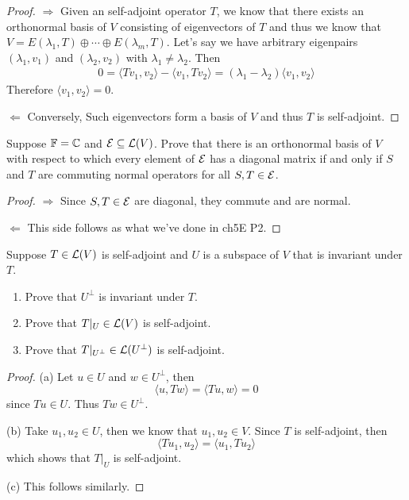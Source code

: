 \documentclass{extarticle}
\begin{document}
\begin{proof}
\(\Rightarrow\) Given an self-adjoint operator \(T\), we know that there exists an orthonormal basis 
of \(V\) consisting of eigenvectors of \(T\) and thus we know that \(V = E(\lambda_1, T) \oplus 
\cdots \oplus E(\lambda_m, T)\). Let's say we have arbitrary eigenpairs \((\lambda_1, v_1)\) and 
\((\lambda_2, v_2)\) with \(\lambda_1 \neq \lambda_2\). Then 
\begin{align*}
    0 = \langle Tv_1,v_2 \rangle - \langle v_1,Tv_2 \rangle 
    = (\lambda_1 - \lambda_2) \langle v_1,v_2 \rangle
\end{align*}
Therefore \(\langle v_1,v_2 \rangle = 0\). 

\(\Leftarrow\) Conversely, Such eigenvectors form a basis of \(V\) and thus \(T\) is self-adjoint. 
\end{proof}


\begin{problem}{16}
    Suppose \(\mathbb{F} = \mathbb{C}\) and \(\mathcal{E} \subseteq \mathcal{L}(V)\). Prove that there is an orthonormal basis of 
    \(V\) with respect to which every element of \(\mathcal{E}\) has a diagonal matrix if and only if 
    \(S\) and \(T\) are commuting normal operators for all \(S, T \in \mathcal{E}\).
\end{problem}

\begin{proof}
\(\Rightarrow\) Since \(S, T \in \mathcal{E}\) are diagonal, they commute and are normal. 

\(\Leftarrow\) This side follows as what we've done in ch5E P2.
\end{proof}


\begin{problem}{19}
    Suppose \(T \in \mathcal{L}(V)\) is self-adjoint and \(U\) is a subspace of \(V\) that is invariant 
    under \(T\). 
    \begin{enumerate}[label=(\alph*)]
        \item Prove that \(U^\perp\) is invariant under \(T\). 
        \item Prove that \(T|_U \in \mathcal{L}(V)\) is self-adjoint. 
        \item Prove that \(T |_{U^\perp} \in \mathcal{L}(U^\perp)\) is self-adjoint.
    \end{enumerate}
\end{problem}


\begin{proof}
(a) Let \(u \in U\) and \(w \in U^\perp\), then 
\[\langle u,Tw \rangle = \langle Tu,w \rangle = 0\]
since \(Tu \in U\). Thus \(Tw \in U^\perp\).

(b) Take \(u_1, u_2 \in U\), then we know that \(u_1, u_2 \in V\). Since \(T\) is self-adjoint, then 
\[\langle Tu_1, u_2 \rangle = \langle u_1,Tu_2 \rangle\]
which shows that \(T|_U\) is self-adjoint. 

(c) This follows similarly.
\end{proof}
\end{document}

